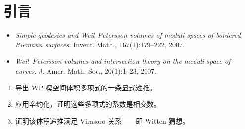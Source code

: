 
\section{引言}

\begin{itemize}[leftmargin=1.6em,itemsep=2pt,topsep=2pt]
\item \emph{Simple geodesics and Weil--Petersson volumes of moduli spaces of bordered
  Riemann surfaces.} Invent. Math., 167(1):179--222, 2007.
\item \emph{Weil--Petersson volumes and intersection theory on the moduli space of
  curves.} J. Amer. Math. Soc., 20(1):1--23, 2007.
\end{itemize}


\begin{enumerate}[leftmargin=1.8em,itemsep=2pt,topsep=2pt]
\item 导出 WP 模空间体积多项式的一条显式递推。
\item 应用辛约化，证明这些多项式的系数是相交数。
\item 证明该体积递推满足 Virasoro 关系——即 Witten 猜想。
\end{enumerate}

